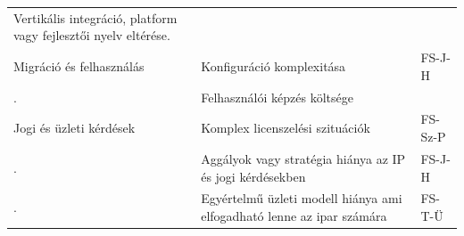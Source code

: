 \documentclass[12pt,magyar,a4paper,oneside]{scrreprt}
\begin{document}
\begin{longtable}[]{@{}lll@{}}
\begin{minipage}[t]{0.49\columnwidth}
Vertikális integráció, platform vagy fejlesztői nyelv eltérése.\strut
\end{minipage} & \begin{minipage}[t]{0.18\columnwidth}\raggedright
\strut
\end{minipage}\tabularnewline
\begin{minipage}[t]{0.24\columnwidth}\raggedright
Migráció és felhasználás\strut
\end{minipage} & \begin{minipage}[t]{0.49\columnwidth}\raggedright
Konfiguráció komplexitása\strut
\end{minipage} & \begin{minipage}[t]{0.18\columnwidth}\raggedright
FS-J-H\strut
\end{minipage}\tabularnewline
\begin{minipage}[t]{0.24\columnwidth}\raggedright
.\strut
\end{minipage} & \begin{minipage}[t]{0.49\columnwidth}\raggedright
Felhasználói képzés költsége\strut
\end{minipage} & \begin{minipage}[t]{0.18\columnwidth}\raggedright
\strut
\end{minipage}\tabularnewline
\begin{minipage}[t]{0.24\columnwidth}\raggedright
Jogi és üzleti kérdések\strut
\end{minipage} & \begin{minipage}[t]{0.49\columnwidth}\raggedright
Komplex licenszelési szituációk\strut
\end{minipage} & \begin{minipage}[t]{0.18\columnwidth}\raggedright
FS-Sz-P\strut
\end{minipage}\tabularnewline
\begin{minipage}[t]{0.24\columnwidth}\raggedright
.\strut
\end{minipage} & \begin{minipage}[t]{0.49\columnwidth}\raggedright
Aggályok vagy stratégia hiánya az IP és jogi kérdésekben\strut
\end{minipage} & \begin{minipage}[t]{0.18\columnwidth}\raggedright
FS-J-H\strut
\end{minipage}\tabularnewline
\begin{minipage}[t]{0.24\columnwidth}\raggedright
.\strut
\end{minipage} & \begin{minipage}[t]{0.49\columnwidth}\raggedright
Egyértelmű üzleti modell hiánya ami elfogadható lenne az ipar
számára\strut
\end{minipage} & \begin{minipage}[t]{0.18\columnwidth}\raggedright
FS-T-Ü\strut
\end{minipage}\tabularnewline
\bottomrule
\end{longtable}
\end{document}
